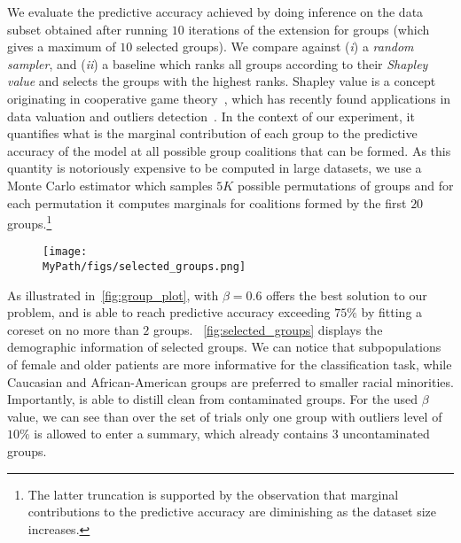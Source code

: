 We evaluate the predictive accuracy achieved by doing inference on the data subset obtained after running $10$ iterations of the \bcores{} extension for groups (which gives a maximum of $10$ selected groups). We compare against (\emph{i}) a \emph{random sampler}, and (\emph{ii}) a baseline which ranks all groups according to their \emph{Shapley value} and selects the groups with the highest ranks. Shapley value is a concept originating in cooperative game theory~\citep{shapley53}, which has recently found applications in data valuation and outliers detection~\citep{ghorbani19}. In the context of our experiment, it quantifies what is the marginal contribution of each group to the predictive accuracy of the model at all possible group coalitions that can be formed. As this quantity is notoriously expensive to be computed in large datasets, we use a Monte Carlo estimator which samples $5K$ possible permutations of groups and for each permutation it computes marginals for coalitions formed by the first $20$ groups.\footnote{The latter truncation is supported by the observation that marginal contributions to the predictive accuracy are diminishing as the dataset size increases.}

\begin{figure*}[!t]
	\begin{subfigure}[b]{.8\textwidth} 
		\centering
		\hspace*{2cm}
		\texttt{[image: \\MyPath/figs/selected\_groups.png]}
	\end{subfigure}	
	\centering
	\caption{Attributes of selected groups after running $10$ iterations of \bcores{} with $\beta=0.6$ on the contaminated \textsc{HospitalReadmissions} dataset (repeated over $5$ random trials).}
	\label{fig:selected_groups}
\end{figure*}

As illustrated in~\cref{fig:group_plot}, \bcores{} with $\beta=0.6$ offers the best solution to our problem, and is able to reach predictive accuracy exceeding $75\%$ by fitting a coreset on no more than $2$ groups. ~\cref{fig:selected_groups} displays the demographic information of selected groups. We can notice that subpopulations of female and older patients are more informative for the classification task, while Caucasian and African-American groups are preferred to smaller racial minorities. Importantly, \bcores{} is able to distill clean from contaminated groups. For the used $\beta$ value, we can see than over the set of trials only one group with outliers level of $10\%$ is allowed to enter a summary, which already contains $3$ uncontaminated groups.

